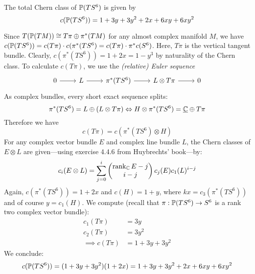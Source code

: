 \documentclass{scrartcl}
\begin{document}
\begin{prop}
	The total Chern class of $\P(TS^6)$ is given by 
	\begin{equation*}
		c(\P(TS^6))=1+3y+3y^2+2x+6xy+6xy^2
	\end{equation*}
\end{prop}
\begin{myproof}
	Since $T(\P(TM))\cong T\pi\oplus \pi^*(TM)$ for any almost complex manifold $M$, we have $c(\P(TS^6))=c(T\pi)\cdot c(\pi^*(TS^6)=c(T\pi)\cdot \pi^*c(S^6)$. Here, $T\pi$ is the vertical tangent bundle. Clearly, $c(\pi^*(TS^6))=1+2x=1-y^3$ by naturality of the Chern class. To calculate $c(T\pi)$, we use the \emph{(relative) Euler sequence}
	\begin{equation*}
		\begin{tikzcd}
			0 \ar[r] & L \ar[r] & \pi^*(TS^6) \ar[r] & L\otimes T\pi \ar[r] & 0
		\end{tikzcd}
	\end{equation*}
	As complex bundles, every short exact sequence splits:
	\begin{equation*}
		\pi^*(TS^6)=L\oplus (L\otimes T\pi)\Leftrightarrow
		H\otimes \pi^*(TS^6)=\underline{\C}\oplus T\pi
	\end{equation*}
	Therefore we have 
	\begin{equation*}
		c(T\pi)=c(\pi^*(TS^6)\otimes H)
	\end{equation*}
	For any complex vector bundle $E$ and complex line bundle $L$, the Chern classes of $E\otimes L$ are given---using exercise 4.4.6 from Huybrechts' book---by:
	\begin{equation*}
		c_i(E\otimes L)=\sum_{j=0}^i 
		\begin{pmatrix}
			\rank_\C E-j \\ i-j 
		\end{pmatrix}
		c_j(E)c_1(L)^{i-j}
	\end{equation*}
	Again, $c(\pi^*(TS^6))=1+2x$ and $c(H)=1+y$, where $kx=c_3(\pi^*(TS^6))$ and of course $y=c_1(H)$. We compute (recall that $\pi:\P(TS^6)\to S^6$ is a rank two complex vector bundle):
	\begin{align*}
		c_1(T\pi)&=3y\\
		c_2(T\pi)&=3y^2\\
		\implies c(T\pi)&=1+3y+3y^2
	\end{align*}
	We conclude:
	\begin{equation*}
		c(\P(TS^6))=(1+3y+3y^2)(1+2x)
		=1+3y+3y^2+2x+6xy+6xy^2
	\end{equation*}
\end{myproof}\unskip
\end{document}
